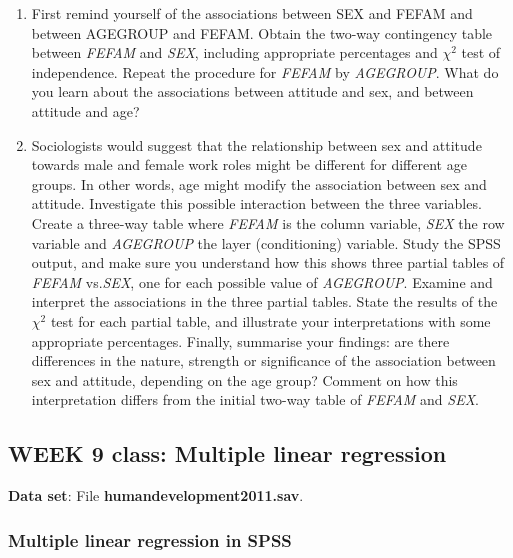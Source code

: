 \documentclass[11pt,a4paper,openany]{book}
\begin{document}
\begin{enumerate}
\def\labelenumi{\arabic{enumi}.}
\item
  First remind yourself of the associations between SEX and FEFAM and
  between AGEGROUP and FEFAM. Obtain the two-way contingency table
  between \emph{FEFAM} and \emph{SEX}, including appropriate percentages
  and \(\chi^{2}\) test of independence. Repeat the procedure for
  \emph{FEFAM} by \emph{AGEGROUP}. What do you learn about the
  associations between attitude and sex, and between attitude and age?
\item
  Sociologists would suggest that the relationship between sex and
  attitude towards male and female work roles might be different for
  different age groups. In other words, age might modify the association
  between sex and attitude. Investigate this possible interaction
  between the three variables. Create a three-way table where
  \emph{FEFAM} is the column variable, \emph{SEX} the row variable and
  \emph{AGEGROUP} the layer (conditioning) variable. Study the SPSS
  output, and make sure you understand how this shows three partial
  tables of \emph{FEFAM} vs.\emph{SEX}, one for each possible value of
  \emph{AGEGROUP}. Examine and interpret the associations in the three
  partial tables. State the results of the \(\chi^{2}\) test for each
  partial table, and illustrate your interpretations with some
  appropriate percentages. Finally, summarise your findings: are there
  differences in the nature, strength or significance of the association
  between sex and attitude, depending on the age group? Comment on how
  this interpretation differs from the initial two-way table of
  \emph{FEFAM} and \emph{SEX}.
\end{enumerate}

\newpage

\subsection{WEEK 9 class: Multiple linear
regression}\label{week-9-class-multiple-linear-regression}

\textbf{Data set}: File \textbf{humandevelopment2011.sav}.

\subsubsection*{Multiple linear regression in
SPSS}\label{multiple-linear-regression-in-spss}
\end{document}
